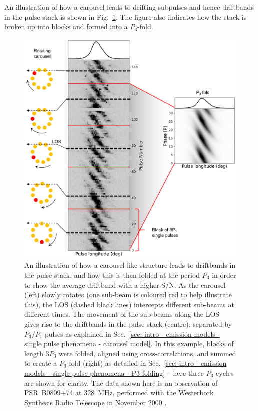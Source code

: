An illustration of how a carousel leads to drifting subpulses and hence driftbands in the pulse stack is shown in Fig.~\ref{fig: intro - driftband schematic}. The figure also indicates how the stack is broken up into blocks and formed into a $P_3$-fold.

\begin{figure}
	\centering
	\includegraphics[width=1.0\textwidth]{Figures/Introduction/car2p3fold}
    \caption[Driftbands produced by a carousel and $P_3$-folding of a pulse stack]{An illustration of how a carousel-like structure leads to driftbands in the pulse stack, and how this is then folded at the period $P_3$ in order to show the average driftband with a higher S/N. As the carousel (left) slowly rotates (one sub-beam is coloured red to help illustrate this), the LOS (dashed black lines) intercepts different sub-beams at different times. The movement of the sub-beams along the LOS gives rise to the driftbands in the pulse stack (centre), separated by $P_3/P_1$ pulses as explained in Sec.~\ref{sec: intro - emission models - single pulse phenomena - carousel model}. In this example, blocks of length $3P_3$ were folded, aligned using cross-correlations, and summed to create a $P_3$-fold (right) as detailed in Sec.~\ref{sec: intro - emission models - single pulse phenomena - P3 folding} -- here three $P_3$ cycles are shown for clarity. The data shown here is an observation of PSR~B0809+74 at 328~MHz, performed with the Westerbork Synthesis Radio Telescope in November 2000 \citep{RRS+2002}.}
    \label{fig: intro - driftband schematic} 
\end{figure}

